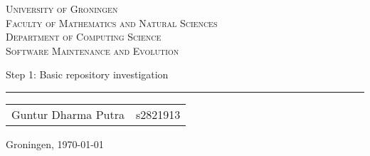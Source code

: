 
\begin{titlepage}

\newcommand{\titleinfo} {Software Maintenance and Evolution}
\newcommand{\authorinfo} {Guntur Putra - s2821913}

\center
\textsc{\Large University of Groningen} \\[0.2cm]
\textsc{Faculty of Mathematics and Natural Sciences} \\[0.2cm]
\textsc{Department of Computing Science} \\[0.5cm]
\textsc{\large \titleinfo} \\[1.5cm]


\begin{flushleft}
{\LARGE Step 1: Basic repository investigation}
{\rule{\linewidth}{0.1mm}}
\end{flushleft}


\begin{flushright}
	\large
	\begin{tabular}{ll}
		Guntur Dharma Putra & s2821913 
	\end{tabular}
\end{flushright}

\vfill

Groningen, \today\\

\end{titlepage}

